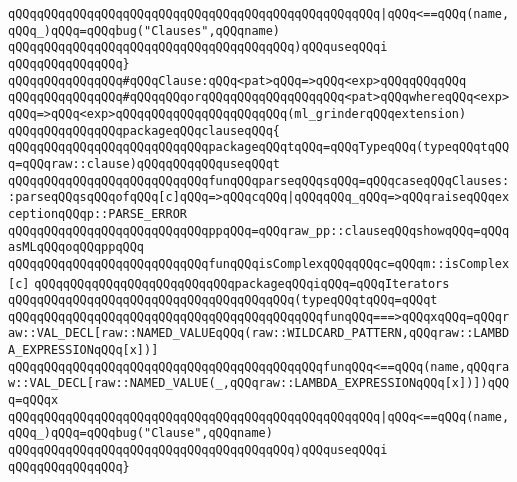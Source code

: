 \verb|qQQqqQQqqQQqqQQqqQQqqQQqqQQqqQQqqQQqqQQqqQQqqQQqqQQq|\verb#|qQQq<==qQQq(name,qQQq_)qQQq=qQQqbug("Clauses",qQQqname)#\newline
\verb|qQQqqQQqqQQqqQQqqQQqqQQqqQQqqQQqqQQqqQQq)qQQquseqQQqi|\newline
\verb|qQQqqQQqqQQqqQQq}|\newline
\newline
\verb|qQQqqQQqqQQqqQQq#qQQqClause:qQQq<pat>qQQq=>qQQq<exp>qQQqqQQqqQQq|\newline
\verb|qQQqqQQqqQQqqQQq#qQQqqQQqorqQQqqQQqqQQqqQQqqQQq<pat>qQQqwhereqQQq<exp>qQQq=>qQQq<exp>qQQqqQQqqQQqqQQqqQQqqQQq(ml_grinderqQQqextension)|\newline
\newline
\verb|qQQqqQQqqQQqqQQqpackageqQQqclauseqQQq{|\newline
\newline
\verb|qQQqqQQqqQQqqQQqqQQqqQQqqQQqpackageqQQqtqQQq=qQQqTypeqQQq(typeqQQqtqQQq=qQQqraw::clause)qQQqqQQqqQQquseqQQqt|\newline
\newline
\verb|qQQqqQQqqQQqqQQqqQQqqQQqqQQqfunqQQqparseqQQqsqQQq=qQQqcaseqQQqClauses::parseqQQqsqQQqofqQQq[c]qQQq=>qQQqcqQQq|\verb#|qQQqqQQq_qQQq=>qQQqraiseqQQqexceptionqQQqp::PARSE_ERROR#\newline
\newline
\verb|qQQqqQQqqQQqqQQqqQQqqQQqqQQqppqQQq=qQQqraw_pp::clauseqQQqshowqQQq=qQQqasMLqQQqoqQQqppqQQq|\newline
\verb|qQQqqQQqqQQqqQQqqQQqqQQqqQQqfunqQQqisComplexqQQqqQQqc=qQQqm::isComplex[c]|\newline
\verb|qQQqqQQqqQQqqQQqqQQqqQQqqQQqpackageqQQqiqQQq=qQQqIterators|\newline
\verb|qQQqqQQqqQQqqQQqqQQqqQQqqQQqqQQqqQQqqQQq(typeqQQqtqQQq=qQQqt|\newline
\verb|qQQqqQQqqQQqqQQqqQQqqQQqqQQqqQQqqQQqqQQqqQQqfunqQQq===>qQQqxqQQq=qQQqraw::VAL_DECL[raw::NAMED_VALUEqQQq(raw::WILDCARD_PATTERN,qQQqraw::LAMBDA_EXPRESSIONqQQq[x])]|\newline
\verb|qQQqqQQqqQQqqQQqqQQqqQQqqQQqqQQqqQQqqQQqqQQqfunqQQq<==qQQq(name,qQQqraw::VAL_DECL[raw::NAMED_VALUE(_,qQQqraw::LAMBDA_EXPRESSIONqQQq[x])])qQQq=qQQqx|\newline
\verb|qQQqqQQqqQQqqQQqqQQqqQQqqQQqqQQqqQQqqQQqqQQqqQQqqQQq|\verb#|qQQq<==qQQq(name,qQQq_)qQQq=qQQqbug("Clause",qQQqname)#\newline
\verb|qQQqqQQqqQQqqQQqqQQqqQQqqQQqqQQqqQQqqQQq)qQQquseqQQqi|\newline
\verb|qQQqqQQqqQQqqQQq}|\newline
